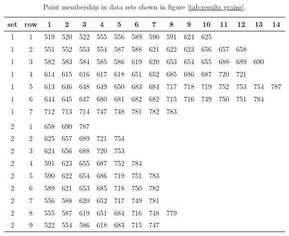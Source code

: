 {\tiny{
\begin{table}[htbp]
\caption{Point membership in data sets shown in figure \ref{tab:results grains}.}
  \begin{center}
    \begin{tabular}{cccccccccccccccc}
      set & row & 1 & 2 & 3 & 4 & 5 & 6 & 7 & 8 & 9 & 10 & 11 & 12 & 13 & 14 \\\hline
      1 &  1 & 519 & 520 & 522 & 555 & 556 & 589 & 590 & 591 & 624 & 625 \\
      1 &  2 & 551 & 552 & 553 & 554 & 587 & 588 & 621 & 622 & 623 & 656 & 657 & 658 \\
      1 &  3 & 582 & 583 & 584 & 585 & 586 & 619 & 620 & 653 & 654 & 655 & 688 & 689 & 690 \\
      1 &  4 & 614 & 615 & 616 & 617 & 618 & 651 & 652 & 685 & 686 & 687 & 720 & 721 \\
      1 &  5 & 613 & 646 & 648 & 649 & 650 & 683 & 684 & 717 & 718 & 719 & 752 & 753 & 754 & 787 \\
      1 &  6 & 644 & 645 & 647 & 680 & 681 & 682 & 682 & 715 & 716 & 749 & 750 & 751 & 784 \\
      1 &  7 & 712 & 713 & 714 & 747 & 748 & 781 & 782 & 783 \\
      && \\
      2 &  1 & 658 & 690 & 787 \\
      2 &  2 & 625 & 657 & 689 & 721 & 754 \\
      2 &  3 & 624 & 656 & 688 & 720 & 753 \\
      2 &  4 & 591 & 623 & 655 & 687 & 752 & 784 \\
      2 &  5 & 590 & 622 & 654 & 686 & 719 & 751 & 783 \\
      2 &  6 & 589 & 621 & 653 & 685 & 718 & 750 & 782 \\
      2 &  7 & 556 & 588 & 620 & 652 & 717 & 749 & 781 \\
      2 &  8 & 555 & 587 & 619 & 651 & 684 & 716 & 748 & 779 \\
      2 &  9 & 522 & 554 & 586 & 618 & 683 & 715 & 747 \\

\end{tabular}
\end{center}
\end{table}}}

